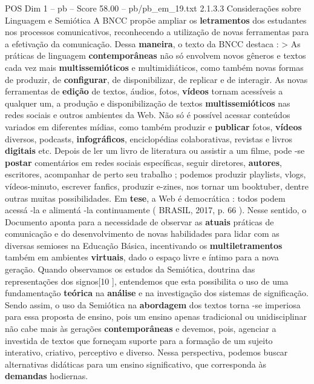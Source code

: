 \begin{textsample}{POS Dim 1 – pb – Score 58.00 – pb/pb\_em\_19.txt}  \label{ex:f1_pos_145}
2.1.3.3 Considerações sobre Linguagem e Semiótica A BNCC propõe ampliar os \textbf{letramentos} dos estudantes nos processos comunicativos, reconhecendo a utilização de novas ferramentas para a efetivação da comunicação.
Dessa \textbf{maneira}, o texto da BNCC destaca : > As práticas de linguagem \textbf{contemporâneas} não só envolvem novos gêneros e textos cada vez mais \textbf{multissemióticos} e multimidiáticos, como também novas formas de produzir, de \textbf{configurar}, de disponibilizar, de replicar e de interagir.
As novas ferramentas de \textbf{edição} de textos, áudios, fotos, \textbf{vídeos} tornam acessíveis a qualquer um, a produção e disponibilização de textos \textbf{multissemióticos} nas redes sociais e outros ambientes da Web.
Não só é possível acessar conteúdos variados em diferentes mídias, como também produzir e \textbf{publicar} fotos, \textbf{vídeos} diversos, podcasts, \textbf{infográficos}, enciclopédias colaborativas, revistas e livros \textbf{digitais} etc.
Depois de ler um livro de literatura ou assistir a um filme, pode -se \textbf{postar} comentários em redes sociais específicas, seguir diretores, \textbf{autores}, escritores, acompanhar de perto seu trabalho ; podemos produzir playlists, vlogs, vídeos-minuto, escrever fanfics, produzir e-zines, nos tornar um booktuber, dentre outras muitas possibilidades.
Em \textbf{tese}, a Web é democrática : todos podem acessá -la e alimentá -la continuamente ( BRASIL, 2017, p. 66 ).
Nesse sentido, o Documento aponta para a necessidade de observar as \textbf{atuais} práticas de comunicação e do desenvolvimento de novas habilidades para lidar com as diversas semioses na Educação Básica, incentivando os \textbf{multiletramentos} também em ambientes \textbf{virtuais}, dado o espaço livre e íntimo para a nova geração.
Quando observamos os estudos da Semiótica, doutrina das representações dos signos[10 ], entendemos que esta possibilita o uso de uma fundamentação \textbf{teórica} na \textbf{análise} e na investigação dos sistemas de significação.
Sendo assim, o uso da Semiótica na \textbf{abordagem} dos textos torna -se imperiosa para essa proposta de ensino, pois um ensino apenas tradicional ou unidisciplinar não cabe mais às gerações \textbf{contemporâneas} e devemos, pois, agenciar a investida de textos que forneçam suporte para a formação de um sujeito interativo, criativo, perceptivo e diverso.
Nessa perspectiva, podemos buscar alternativas didáticas para um ensino significativo, que corresponda às \textbf{demandas} hodiernas.

\end{textsample}
